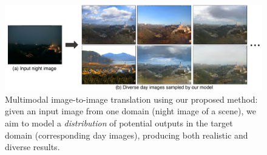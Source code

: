 \begin{figure}
\centering
\includegraphics[width=1.\linewidth]{imgs/teaser.pdf}
\vspace{-4mm}
\caption{\small Multimodal image-to-image translation using our proposed method: given an input image from one domain (night image of a scene), we aim to model a \textit{distribution} of potential outputs in the target domain (corresponding day images), producing both realistic and diverse results.}
\vspace{-4mm}
\label{fig:teaser}
\end{figure}


